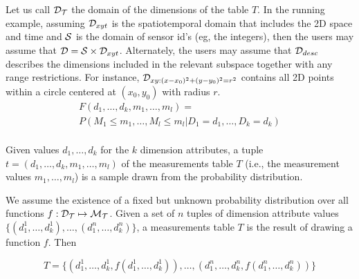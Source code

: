 Let us call ${\cal D_T}$ the domain of the dimensions of the table
$T$. In the running example, assuming ${\cal D}_{xyt}$ is the
spatiotemporal domain that includes the 2D space and time and ${\cal
  S}$ is the domain of sensor id's (eg, the integers), then the users
may assume that ${\cal D} = {\cal S} \times {\cal
  D}_{xyt}$. Alternately, the users may assume that ${\cal D}_{desc}$
describes the dimensions included in the relevant subspace together
with any range restrictions. For instance, ${\cal D}_{xy:
  (x-x_0)^2+(y-y_0)^2 = r^2}$ contains all 2D points within a circle
centered at $(x_0, y_0)$ with radius $r$. \\

\[ 
\begin{array}{l}
F(d_1, \ldots, d_k, m_1, \ldots, m_l) = \\
P(M_1 \leq m_1, \ldots, M_l \leq m_l | D_1 = d_1, \ldots, D_k = d_k) \\
\end{array}
\]

Given values $d_1,\ldots,d_k$ for the $k$ dimension attributes, a tuple $t=(d_1,\ldots,d_k,m_1,\ldots,m_l)$ of the measurements table $T$ (i.e., the measurement values $m_1, \ldots, m_l$) is a sample drawn from the probability distribution.  

 We assume the existence of a fixed but unknown probability distribution over all functions $f : {\cal D_T} \mapsto {\cal M_T}$. Given a set of $n$ tuples of dimension attribute values $\{(d_1^1,\ldots,d_k^1),\ldots,(d_1^n,\ldots,d_k^n)\}$, a measurements table $T$ is the result of drawing a function $f$. Then

\[
T =  \{(d_1^1,\ldots,d_k^1, f(d_1^1,\ldots,d_k^1)),\ldots,(d_1^n,\ldots,d_k^n,f(d_1^n,\ldots,d_k^n))\}
\]



